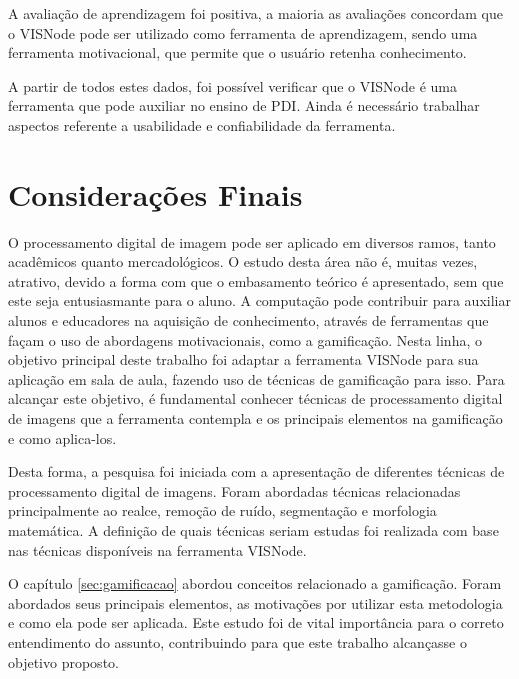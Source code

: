 \documentclass[
	12pt,				%
	oneside,			%
	a4paper,			%
	english,			%
	french,				%
	spanish,			%
	brazil,				%
	]{abntex2}
\begin{document}
A avaliação de aprendizagem foi positiva, a maioria as avaliações concordam que o VISNode pode ser utilizado como ferramenta de aprendizagem, sendo uma ferramenta motivacional, que permite que o usuário retenha conhecimento.

A partir de todos estes dados, foi possível verificar que o VISNode é uma ferramenta que pode auxiliar no ensino de PDI. Ainda é necessário trabalhar aspectos referente a usabilidade e confiabilidade da ferramenta.

% 

\chapter[Considerações Finais]{Considerações Finais}

O processamento digital de imagem pode ser aplicado em diversos ramos, tanto acadêmicos quanto mercadológicos. O estudo desta área não é, muitas vezes, atrativo, devido a forma com que o embasamento teórico é apresentado, sem que este seja entusiasmante para o aluno. A computação pode contribuir para auxiliar alunos e educadores na aquisição de conhecimento, através de ferramentas que façam o uso de abordagens motivacionais, como a gamificação. Nesta linha, o objetivo principal deste trabalho foi adaptar a ferramenta VISNode para sua aplicação em sala de aula, fazendo uso de técnicas de gamificação para isso. Para alcançar este objetivo, é fundamental conhecer técnicas de processamento digital de imagens que a ferramenta contempla e os principais elementos na gamificação e como aplica-los.

Desta forma, a pesquisa foi iniciada com a apresentação de diferentes técnicas de processamento digital de imagens. Foram abordadas técnicas relacionadas principalmente ao realce, remoção de ruído, segmentação e morfologia matemática. A definição de quais técnicas seriam estudas foi realizada com base nas técnicas disponíveis na ferramenta VISNode.

O capítulo \ref{sec:gamificacao} abordou conceitos relacionado a gamificação. Foram abordados seus principais elementos, as motivações por utilizar esta metodologia e como ela pode ser aplicada. Este estudo foi de vital importância para o correto entendimento do assunto, contribuindo para que este trabalho alcançasse o objetivo proposto.
\end{document}

